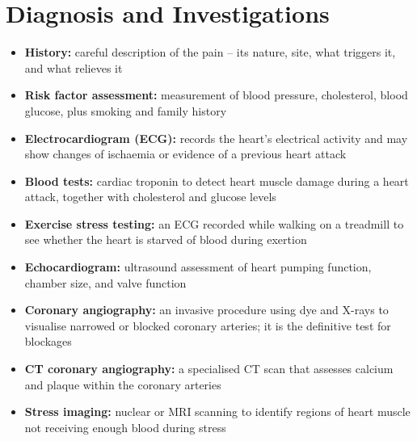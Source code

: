\section*{Diagnosis and Investigations}
\begin{itemize}
    \item \textbf{History:} careful description of the pain -- its nature, site, what triggers it, and what relieves it
    \item \textbf{Risk factor assessment:} measurement of blood pressure, cholesterol, blood glucose, plus smoking and family history
    \item \textbf{Electrocardiogram (ECG):} records the heart's electrical activity and may show changes of ischaemia or evidence of a previous heart attack
    \item \textbf{Blood tests:} cardiac troponin to detect heart muscle damage during a heart attack, together with cholesterol and glucose levels
    \item \textbf{Exercise stress testing:} an ECG recorded while walking on a treadmill to see whether the heart is starved of blood during exertion
    \item \textbf{Echocardiogram:} ultrasound assessment of heart pumping function, chamber size, and valve function
    \item \textbf{Coronary angiography:} an invasive procedure using dye and X-rays to visualise narrowed or blocked coronary arteries; it is the definitive test for blockages
    \item \textbf{CT coronary angiography:} a specialised CT scan that assesses calcium and plaque within the coronary arteries
    \item \textbf{Stress imaging:} nuclear or MRI scanning to identify regions of heart muscle not receiving enough blood during stress
\end{itemize}

